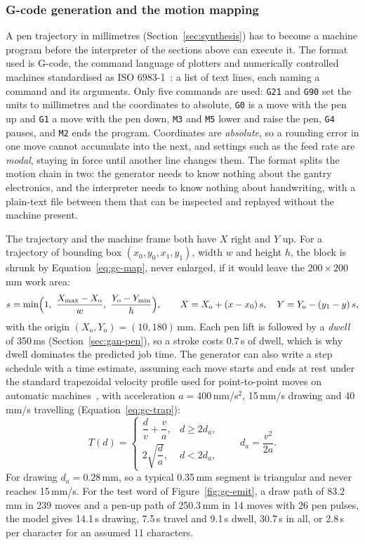 \subsubsection{G-code generation and the motion mapping}
\label{sec:gcode}

A pen trajectory in millimetres (Section~\ref{sec:synthesis}) has to become a machine program before the interpreter of the sections above can execute it. The format used is G-code, the command language of plotters and numerically controlled machines standardised as ISO 6983-1~\cite{iso6983}: a list of text lines, each naming a command and its arguments. Only five commands are used: \texttt{G21} and \texttt{G90} set the units to millimetres and the coordinates to absolute, \texttt{G0} is a move with the pen up and \texttt{G1} a move with the pen down, \texttt{M3} and \texttt{M5} lower and raise the pen, \texttt{G4} pauses, and \texttt{M2} ends the program. Coordinates are \emph{absolute}, so a rounding error in one move cannot accumulate into the next, and settings such as the feed rate are \emph{modal}, staying in force until another line changes them. The format splits the motion chain in two: the generator needs to know nothing about the gantry electronics, and the interpreter needs to know nothing about handwriting, with a plain-text file between them that can be inspected and replayed without the machine present.

The trajectory and the machine frame both have $X$ right and $Y$ up. For a trajectory of bounding box $(x_0,y_0,x_1,y_1)$, width $w$ and height $h$, the block is shrunk by Equation~\ref{eq:gc-map}, never enlarged, if it would leave the $200\times200$\,mm work area:
\begin{equation}
s=\min\Bigl(1,\ \frac{X_{\max}-X_{\mathrm o}}{w},\ \frac{Y_{\mathrm o}-Y_{\min}}{h}\Bigr),\qquad X=X_{\mathrm o}+(x-x_0)\,s,\quad Y=Y_{\mathrm o}-(y_1-y)\,s,
\label{eq:gc-map}
\end{equation}
with the origin $(X_{\mathrm o},Y_{\mathrm o})=(10,180)$\,mm. Each pen lift is followed by a \emph{dwell} of 350\,ms (Section~\ref{sec:gan-pen}), so a stroke costs 0.7\,s of dwell, which is why dwell dominates the predicted job time. The generator can also write a step schedule with a time estimate, assuming each move starts and ends at rest under the standard trapezoidal velocity profile used for point-to-point moves on automatic machines~\cite{biagiotti2008}, with acceleration $a=400$\,mm/s$^2$, 15\,mm/s drawing and 40\,mm/s travelling (Equation~\ref{eq:gc-trap}):
\begin{equation}
T(d)=\begin{cases}\dfrac{d}{v}+\dfrac{v}{a},&d\ge2d_a,\\[2mm]2\sqrt{\dfrac{d}{a}},&d<2d_a,\end{cases}\qquad d_a=\frac{v^2}{2a}.
\label{eq:gc-trap}
\end{equation}
For drawing $d_a=0.28$\,mm, so a typical 0.35\,mm segment is triangular and never reaches 15\,mm/s. For the test word of Figure~\ref{fig:gc-emit}, a draw path of 83.2\,mm in 239 moves and a pen-up path of 250.3\,mm in 14 moves with 26 pen pulses, the model gives 14.1\,s drawing, 7.5\,s travel and 9.1\,s dwell, 30.7\,s in all, or 2.8\,s per character for an assumed 11 characters.

